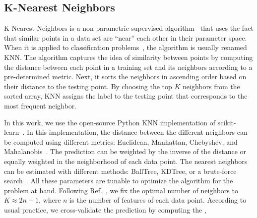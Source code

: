 \subsection*{K-Nearest Neighbors}

K-Nearest Neighbors is a non-parametric supervised algorithm~\cite{Fix:1951,Cover:1967} that uses the fact that similar points in a data set are ``near'' each other in their
parameter space. When it is applied to classification problems~\cite{Guo:2004}, the algorithm is usually renamed \ac{KNN}. The algorithm captures the idea of similarity between
points by computing the distance between each point in a training set and its neighbors according to a pre-determined metric. Next, it sorts the neighbors in ascending order based on
their distance to the testing point. By choosing the top $K$ neighbors from the sorted array, \ac{KNN} assigns the label to the testing point that corresponds to the most
frequent neighbor.

In this work, we use the open-source Python \ac{KNN} implementation of scikit-learn~\cite{Pedregosa:2011}. In this implementation, the distance between the different neighbors can be
computed using different metrics: Euclidean, Manhattan, Chebyshev, and Mahalanobis~\cite{ADictionaryofStatistics}. The prediction can be weighted by the inverse of the distance or equally
weighted in the neighborhood of each data point. The nearest neighbors can be estimated with different methods: BallTree, KDTree, or a brute-force search~\cite{Bentley1975,Omohundro1989}. All these parameters are tunable to optimize the algorithm for the problem at hand. Following Ref.~\cite{Chatterjee:2019avs}, we fix the optimal number of neighbors to $K \approx 2n+1$,
where $n$ is the number of features of each data point. According to usual practice, we cross-validate the prediction by computing the ,   
